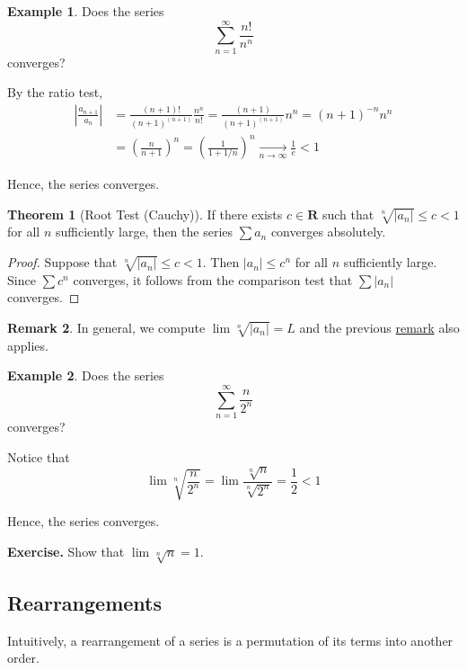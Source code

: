 \documentclass[tikz,12pt,a4paper]{article}
\theoremstyle{definition}
\newtheorem{theorem}{Theorem}[section]
\newtheorem{remark}[theorem]{Remark}
\newtheorem{example}{Example}[section]
\begin{document}
\begin{example}
	Does the series \[ \sum_{n=1}^\infty \frac{n!}{n^n} \] converges?
	
	By the ratio test,
	\begin{equation*}
		\begin{aligned}
			\left| \frac{a_{n+1}}{a_n} \right| &= \frac{(n+1)!}{(n+1)^{(n+1)}} \frac{n^n}{n!} = \frac{(n+1)}{(n+1)^{(n+1)}} n^n = (n+1)^{-n} n^n \\
			&= \left( \frac{n}{n+1} \right)^n = \left( \frac{1}{1+1/n} \right)^n \underset{n \to \infty}{\longrightarrow} \frac{1}{e} < 1
		\end{aligned}
	\end{equation*}
	
	Hence, the series converges.
\end{example}

\begin{theorem}[Root Test (Cauchy)]
	If there exists $c \in \textbf{R}$ such that $\sqrt[n]{|a_n|} \leq c < 1$ for all $n$ sufficiently large, then the series $\sum a_n$ converges absolutely.
\end{theorem}

\begin{proof}
	Suppose that $\sqrt[n]{|a_n|} \leq c < 1$. Then $|a_n| \leq c^n$ for all $n$ sufficiently large. Since $\sum c^n$ converges, it follows from the comparison test that $\sum |a_n|$ converges.
\end{proof}

\begin{remark}
	In general, we compute $\lim \sqrt[n]{|a_n|} = L$ and the previous \hyperref[ratiorootremark]{remark} also applies.
\end{remark}

\begin{example}
	Does the series \[ \sum_{n=1}^\infty \frac{n}{2^n} \] converges?
	
	Notice that
	\[
		\lim \sqrt[n]{\frac{n}{2^n}} = \lim \frac{\sqrt[n]{n}}{\sqrt[n]{2^n}} = \frac{1}{2} < 1
	\]
	
	Hence, the series converges.
\end{example}

\textbf{Exercise.} Show that $\lim \sqrt[n]{n} = 1$.

\subsection{Rearrangements}

Intuitively, a rearrangement of a series is a permutation of its terms into another order.
\end{document}
